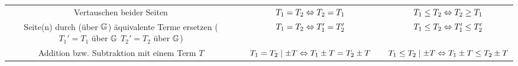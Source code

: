 \begin{itemize}
\begin{longtable}{c|c|c}
		\parbox{0.25\linewidth}{\vspace{2em}Vertauschen beider Seiten\vspace{2em}} &
		\parbox{0.25\linewidth}{\vspace{2em}${\color{white}\Leftrightarrow}T_1 = T_2\\\Leftrightarrow T_2 = T_1$\vspace{2em}} &
		\parbox{0.5\linewidth}{\vspace{2em}${\color{white}\Leftrightarrow}T_1 \le T_2\\\Leftrightarrow T_2 \ge T_1$\vspace{2em}}\\
		
		\parbox{0.25\linewidth}{\vspace{2em}Seite(n) durch\\
			(über $\mathbb{G}$) äquivalente Terme ersetzen\\
			($T_1'=T_1$ über $\mathbb{G}$\\
			$T_2'=T_2$ über $\mathbb{G}$)\vspace{2em}} &
		\parbox{0.25\linewidth}{\vspace{2em}${\color{white}\Leftrightarrow}T_1 = T_2\\\Leftrightarrow T_1' = T_2'$\vspace{2em}} &
		\parbox{0.5\linewidth}{\vspace{2em}${\color{white}\Leftrightarrow}T_1 \le T_2\\\Leftrightarrow T_1' \le T_2'$\vspace{2em}}\\
		
		\parbox{0.25\linewidth}{\vspace{2em}Addition bzw. Subtraktion mit einem Term $T$\vspace{2em}} &
		\parbox{0.25\linewidth}{\vspace{2em}${\color{white}\Leftrightarrow}T_1 = T_2\mid\pm T\\\Leftrightarrow T_1\pm T = T_2\pm T$\vspace{2em}} &
		\parbox{0.5\linewidth}{\vspace{2em}${\color{white}\Leftrightarrow}T_1 \le T_2\mid\pm T\\\Leftrightarrow T_1\pm T \le T_2\pm T$\vspace{2em}}\\
		

\end{longtable}
\end{itemize}
